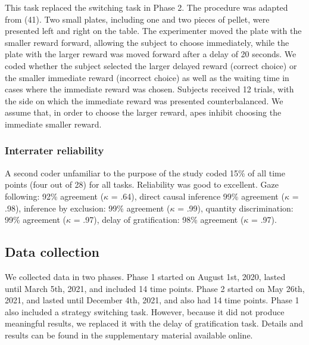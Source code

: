 \documentclass[
  man,floatsintext]{apa6}
\begin{document}
This task replaced the switching task in Phase 2. The procedure was adapted from (41). Two small plates, including one and two pieces of pellet, were presented left and right on the table. The experimenter moved the plate with the smaller reward forward, allowing the subject to choose immediately, while the plate with the larger reward was moved forward after a delay of 20 seconds. We coded whether the subject selected the larger delayed reward (correct choice) or the smaller immediate reward (incorrect choice) as well as the waiting time in cases where the immediate reward was chosen. Subjects received 12 trials, with the side on which the immediate reward was presented counterbalanced. We assume that, in order to choose the larger reward, apes inhibit choosing the immediate smaller reward.

\hypertarget{interrater-reliability}{%
\subsubsection{Interrater reliability}\label{interrater-reliability}}

A second coder unfamiliar to the purpose of the study coded 15\% of all time points (four out of 28) for all tasks. Reliability was good to excellent. Gaze following: 92\% agreement (\(\kappa\) = .64), direct causal inference 99\% agreement (\(\kappa\) = .98), inference by exclusion: 99\% agreement (\(\kappa\) = .99), quantity discrimination: 99\% agreement (\(\kappa\) = .97), delay of gratification: 98\% agreement (\(\kappa\) = .97).

\hypertarget{data-collection}{%
\subsection{Data collection}\label{data-collection}}

We collected data in two phases. Phase 1 started on August 1st, 2020, lasted until March 5th, 2021, and included 14 time points. Phase 2 started on May 26th, 2021, and lasted until December 4th, 2021, and also had 14 time points. Phase 1 also included a strategy switching task. However, because it did not produce meaningful results, we replaced it with the delay of gratification task. Details and results can be found in the supplementary material available online.
\end{document}
